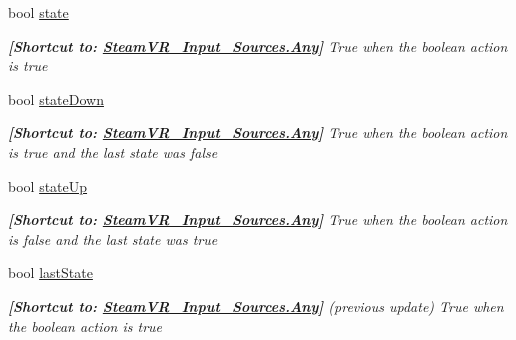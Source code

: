 \begin{DoxyCompactItemize}
bool \mbox{\hyperlink{class_valve_1_1_v_r_1_1_steam_v_r___action___boolean_a9378404032027ec121903aef42227c6a}{state}}
\begin{DoxyCompactList}\small\item\em {\bfseries{\mbox{[}Shortcut to\+: \mbox{\hyperlink{namespace_valve_1_1_v_r_a82e5bf501cc3aa155444ee3f0662853faed36a1ef76a59ee3f15180e0441188ad}{Steam\+V\+R\+\_\+\+Input\+\_\+\+Sources.\+Any}}\mbox{]}}} True when the boolean action is true \end{DoxyCompactList}\item 
bool \mbox{\hyperlink{class_valve_1_1_v_r_1_1_steam_v_r___action___boolean_ac7b9134271850b1ff2225d93763d7b55}{state\+Down}}
\begin{DoxyCompactList}\small\item\em {\bfseries{\mbox{[}Shortcut to\+: \mbox{\hyperlink{namespace_valve_1_1_v_r_a82e5bf501cc3aa155444ee3f0662853faed36a1ef76a59ee3f15180e0441188ad}{Steam\+V\+R\+\_\+\+Input\+\_\+\+Sources.\+Any}}\mbox{]}}} True when the boolean action is true and the last state was false \end{DoxyCompactList}\item 
bool \mbox{\hyperlink{class_valve_1_1_v_r_1_1_steam_v_r___action___boolean_a72a8ac9f25770fb138e9c774bff57570}{state\+Up}}
\begin{DoxyCompactList}\small\item\em {\bfseries{\mbox{[}Shortcut to\+: \mbox{\hyperlink{namespace_valve_1_1_v_r_a82e5bf501cc3aa155444ee3f0662853faed36a1ef76a59ee3f15180e0441188ad}{Steam\+V\+R\+\_\+\+Input\+\_\+\+Sources.\+Any}}\mbox{]}}} True when the boolean action is false and the last state was true \end{DoxyCompactList}\item 
bool \mbox{\hyperlink{class_valve_1_1_v_r_1_1_steam_v_r___action___boolean_ae71b9db566f57de6f618fb3476ac4a5d}{last\+State}}
\begin{DoxyCompactList}\small\item\em {\bfseries{\mbox{[}Shortcut to\+: \mbox{\hyperlink{namespace_valve_1_1_v_r_a82e5bf501cc3aa155444ee3f0662853faed36a1ef76a59ee3f15180e0441188ad}{Steam\+V\+R\+\_\+\+Input\+\_\+\+Sources.\+Any}}\mbox{]}}} (previous update) True when the boolean action is true \end{DoxyCompactList}\item 

\end{DoxyCompactItemize}
